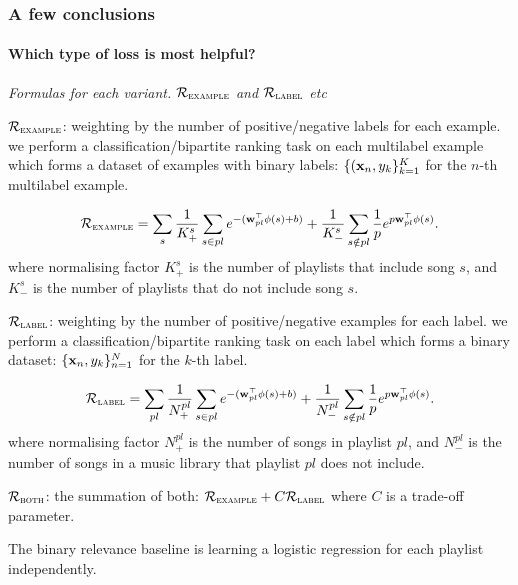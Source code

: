 \subsubsection{A few conclusions}

\paragraph{Which type of loss is most helpful?}

\TODO
{\it Formulas for each variant. $\mathcal{R}_\textsc{example}$ and $\mathcal{R}_\textsc{label}$ etc}

$\mathcal{R}_\textsc{example}$: weighting by the number of positive/negative labels for each example.
\ie we perform a classification/bipartite ranking task on each multilabel example 
which forms a dataset of examples with binary labels: $\{(\mathbf{x}_n, y_k\}_{k=1}^K$ for the $n$-th multilabel example.

\begin{equation*}
\mathcal{R}_\textsc{example} 
= \displaystyle \sum_s 
  \frac{1}{K_+^s} \sum_{s \in pl} e^{-(\mathbf{w}_{pl}^\top \phi(s) + b)} +
  \frac{1}{K_-^s} \sum_{s \notin pl} \frac{1}{p} e^{p \mathbf{w}_{pl}^\top \phi(s)}.
\end{equation*}
where normalising factor $K_+^s$ is the number of playlists that include song $s$,
and $K_-^s$ is the number of playlists that do not include song $s$.


$\mathcal{R}_\textsc{label}$: weighting by the number of positive/negative examples for each label.
\ie we perform a classification/bipartite ranking task on each label which forms a binary dataset:
$\{\mathbf{x}_n, y_k\}_{n=1}^N$ for the $k$-th label.

\begin{equation*}
\mathcal{R}_\textsc{label} 
= \displaystyle \sum_{pl}
  \frac{1}{N_+^{pl}} \sum_{s \in pl} e^{-(\mathbf{w}_{pl}^\top \phi(s) + b)} +
  \frac{1}{N_-^{pl}} \sum_{s \notin pl} \frac{1}{p} e^{p \mathbf{w}_{pl}^\top \phi(s)}.
\end{equation*}
where normalising factor $N_+^{pl}$ is the number of songs in playlist $pl$,
and $N_-^{pl}$ is the number of songs in a music library that playlist $pl$ does not include.


$\mathcal{R}_\textsc{both}$: the summation of both: $\mathcal{R}_\textsc{example} + C \mathcal{R}_\textsc{label}$ 
where $C$ is a trade-off parameter.

The binary relevance baseline is learning a logistic regression for each playlist independently.


